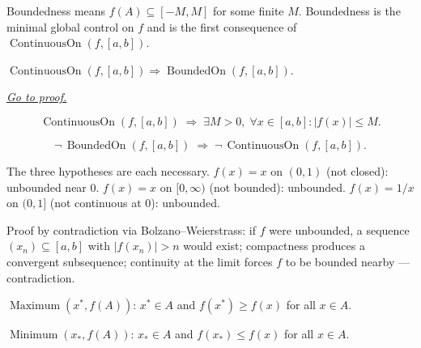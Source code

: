 \begin{remark*}[Interpretation]
Boundedness means $f(A)\subseteq[-M,M]$ for some finite $M$.
Boundedness is the minimal global control on $f$ and is the first
consequence of $\operatorname{ContinuousOn}(f,[a,b])$.
\end{remark*}


\begin{theorem}
\label{thm:boundedness-theorem}
$\operatorname{ContinuousOn}(f,[a,b])
\Rightarrow\operatorname{BoundedOn}(f,[a,b])$.

\smallskip\noindent
\hyperref[prf:boundedness-theorem]{\textit{Go to proof.}}
\end{theorem}

\begin{remark*}
\[
  \operatorname{ContinuousOn}(f,[a,b])
  \;\Rightarrow\;
  \exists M>0,\;\forall x\in[a,b]:|f(x)|\leq M.
\]
\end{remark*}

\begin{remark*}
\[
  \neg\,\operatorname{BoundedOn}(f,[a,b])
  \;\Rightarrow\;
  \neg\,\operatorname{ContinuousOn}(f,[a,b]).
\]
\end{remark*}

\begin{remark*}
The three hypotheses are each necessary. $f(x)=x$ on $(0,1)$ (not
closed): unbounded near $0$. $f(x)=x$ on $[0,\infty)$ (not bounded):
unbounded. $f(x)=1/x$ on $(0,1]$ (not continuous at $0$): unbounded.
\end{remark*}

\begin{remark*}[Interpretation]
Proof by contradiction via Bolzano--Weierstrass: if $f$ were
unbounded, a sequence $(x_n)\subseteq[a,b]$ with $|f(x_n)|>n$
would exist; compactness produces a convergent subsequence;
continuity at the limit forces $f$ to be bounded nearby —
contradiction.
\end{remark*}


\begin{tcolorbox}[title={Definition --- Absolute Extrema}]
\begin{definition}
\label{def:absolute-extrema}
$\operatorname{Maximum}(x^*,f(A))$: $x^*\in A$ and $f(x^*)\geq f(x)$
for all $x\in A$.

$\operatorname{Minimum}(x_*,f(A))$: $x_*\in A$ and $f(x_*)\leq f(x)$
for all $x\in A$.
\end{definition}
\end{tcolorbox}

